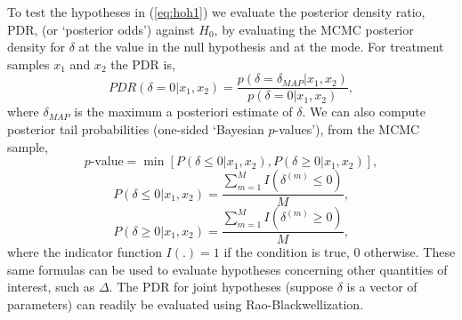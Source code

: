 \documentclass{juliacon}
\begin{document}
\vskip 6pt
To test the hypotheses in (\ref{eq:hoh1}) we evaluate the posterior density ratio, PDR, (or `posterior odds') against $H_0$, by evaluating the MCMC posterior density for $\delta$ at the value in the null hypothesis and at the mode.  For treatment samples $x_1$ and $x_2$ the PDR is,
\begin{equation}
PDR(\delta = 0|x_1, x_2) = \frac{p(\delta=\delta_{MAP}|x_1,x_2)}{p(\delta=0|x_1,x_2)},
\label{eq:odds}
\end{equation}
where $\delta_{MAP}$ is the maximum a posteriori estimate of $\delta$.
We can also compute posterior tail probabilities (one-sided `Bayesian $p$-values'), from the MCMC sample,
\begin{equation}
p\text{-value} = \min{\left[P(\delta \le 0|x_1, x_2),P(\delta \ge 0|x_1, x_2)\right]},
\label{eq:pval}
\end{equation} 
$$P(\delta \le 0|x_1, x_2) =  \frac{\sum_{m=1}^M I(\delta^{(m)} \le 0) }  {M},$$
$$P(\delta \ge 0|x_1, x_2) =  \frac{\sum_{m=1}^M I(\delta^{(m)} \ge 0) }  {M},$$
where the indicator function $I(.) = 1$ if the condition is true, $0$ otherwise. These same formulas can be used to evaluate hypotheses concerning other quantities of interest, such as $\Delta$. The PDR for joint hypotheses (suppose $\delta$ is a vector of parameters) can readily be evaluated using Rao-Blackwellization\cite{Mills2018,Mills2019}.
\end{document}
